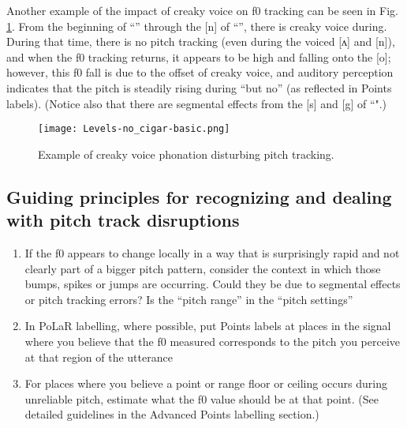 Another example of the impact of creaky voice on f0 tracking can be seen in Fig. \ref{fig:no_cigar f0-tracking}. From the beginning of “” through the [n] of “”, there is creaky voice during. During that time, there is no pitch tracking (even during the voiced [ʌ] and [n]), and when the f0 tracking returns, it appears to be high and falling onto the [o]; however, this f0 fall is due to the offset of creaky voice, and auditory perception indicates  that the pitch is steadily rising during “but no” (as reflected in Points labels). (Notice also that there are segmental effects from the [s] and [g] of “".)

\begin{figure}[H]
\centering
%
\texttt{[image: Levels-no\_cigar-basic.png]}
%
\caption{Example of creaky voice phonation disturbing pitch tracking.%
\label{fig:no_cigar f0-tracking}%
%
}
\end{figure}


\subsection{Guiding principles for recognizing and dealing with pitch track disruptions}\label{sec:guiding-principles-for-recognizing-and-dealing-with-pitch-track-disruptions}

\begin{enumerate} \def\labelenumi{\arabic{enumi}.}
\item If the f0 appears to change locally in a way that is surprisingly rapid and not clearly part of a bigger pitch pattern, consider the context in which those bumps, spikes or jumps are occurring. Could they be due to segmental effects or pitch tracking errors? Is the “pitch range” in the “pitch settings”
\item In PoLaR labelling, where possible, put Points labels at places in the signal where you believe that the f0 measured corresponds to the pitch you perceive at that region of the utterance
\item For places where you believe a point or range floor or ceiling occurs during unreliable pitch, estimate what the f0 value should be at that point. (See detailed guidelines in the Advanced Points labelling section.) \end{enumerate}
